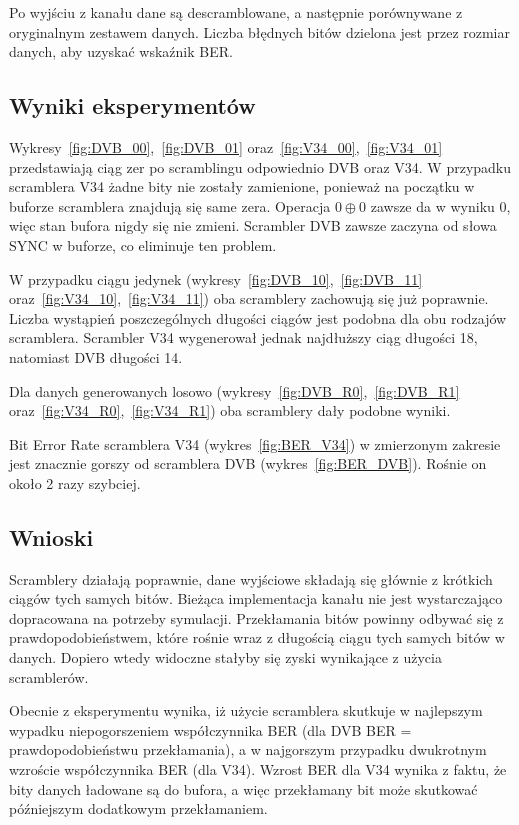 \documentclass[polish, 11pt]{article}
\begin{document}
        Po wyjściu z kanału dane są descramblowane, a następnie porównywane z oryginalnym zestawem danych.
        Liczba błędnych bitów dzielona jest przez rozmiar danych, aby uzyskać wskaźnik BER.\
        
    \subsection{Wyniki eksperymentów}
        Wykresy~\ref{fig:DVB_00},~\ref{fig:DVB_01} oraz~\ref{fig:V34_00},~\ref{fig:V34_01} przedstawiają ciąg zer po scramblingu odpowiednio DVB oraz V34.
        W przypadku scramblera V34 żadne bity nie zostały zamienione, ponieważ na początku w buforze scramblera znajdują się same zera.
        Operacja \(0 \oplus 0\) zawsze da w wyniku 0, więc stan bufora nigdy się nie zmieni.
        Scrambler DVB zawsze zaczyna od słowa SYNC w buforze, co eliminuje ten problem.

        W przypadku ciągu jedynek (wykresy~\ref{fig:DVB_10},~\ref{fig:DVB_11} oraz~\ref{fig:V34_10},~\ref{fig:V34_11}) oba scramblery zachowują się już poprawnie.
        Liczba wystąpień poszczególnych długości ciągów jest podobna dla obu rodzajów scramblera. 
        Scrambler V34 wygenerował jednak najdłuższy ciąg długości 18, natomiast DVB długości 14.

        Dla danych generowanych losowo (wykresy~\ref{fig:DVB_R0},~\ref{fig:DVB_R1} oraz~\ref{fig:V34_R0},~\ref{fig:V34_R1})
        oba scramblery dały podobne wyniki.

        Bit Error Rate scramblera V34 (wykres~\ref{fig:BER_V34}) w zmierzonym zakresie jest znacznie gorszy od scramblera DVB (wykres~\ref{fig:BER_DVB}).
        Rośnie on około 2 razy szybciej.

    \subsection{Wnioski}
        Scramblery działają poprawnie, dane wyjściowe składają się głównie z krótkich ciągów tych samych bitów.
        Bieżąca implementacja kanału nie jest wystarczająco dopracowana na potrzeby symulacji.
        Przekłamania bitów powinny odbywać się z prawdopodobieństwem, które rośnie wraz z długością ciągu tych samych bitów w danych.
        Dopiero wtedy widoczne stałyby się zyski wynikające z użycia scramblerów.
        
        Obecnie z eksperymentu wynika, iż użycie scramblera skutkuje w najlepszym wypadku niepogorszeniem współczynnika BER (dla DVB BER = prawdopodobieństwu przekłamania),
        a w najgorszym przypadku dwukrotnym wzroście współczynnika BER (dla V34).
        Wzrost BER dla V34 wynika z faktu, że bity danych ładowane są do bufora, a więc przekłamany bit może skutkować późniejszym dodatkowym przekłamaniem.
\end{document}

